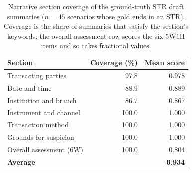 \begin{table}[t]
\centering
\footnotesize
\setlength{\tabcolsep}{5pt}
\caption{Narrative section coverage of the ground-truth STR draft summaries ($n{=}45$ scenarios whose gold ends in an STR). Coverage is the share of summaries that satisfy the section's keywords; the overall-assessment row scores the six 5W1H items and so takes fractional values.}
\label{tab:str_section_coverage}
\begin{tabular}{lrr}
\toprule
\textbf{Section} & \textbf{Coverage (\%)} & \textbf{Mean score} \\
\midrule
Transacting parties & 97.8 & 0.978 \\
Date and time & 88.9 & 0.889 \\
Institution and branch & 86.7 & 0.867 \\
Instrument and channel & 100.0 & 1.000 \\
Transaction method & 100.0 & 1.000 \\
Grounds for suspicion & 100.0 & 1.000 \\
Overall assessment (6W) & 100.0 & 0.804 \\
\midrule
\textbf{Average} & & \textbf{0.934} \\
\bottomrule
\end{tabular}
\end{table}
